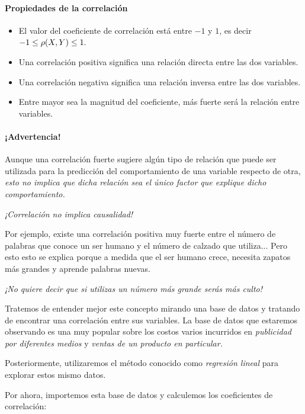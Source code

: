 \paragraph{Propiedades de la correlación}
\begin{itemize}
	\item El valor del coeficiente de correlación está entre $-1$ y $1$, es decir $-1\leq  \rho(X,Y)  \leq 1.$ 
	\item Una correlación positiva significa una relación directa entre las dos variables. 
	\item Una correlación negativa significa una relación inversa entre las dos variables. 
	\item Entre mayor sea la magnitud del coeficiente, más fuerte será la relación entre variables.
\end{itemize}


\paragraph{¡Advertencia!}
Aunque una correlación fuerte sugiere algún tipo de relación que puede ser utilizada para la predicción del comportamiento de una variable respecto de otra, \emph{esto no implica que dicha relación sea el único factor que explique dicho comportamiento.}


\begin{observacion}
	\emph{¡Correlación no implica causalidad!}
\end{observacion}



Por ejemplo, existe una correlación positiva muy fuerte entre el número de palabras que conoce un ser humano y el número de calzado que utiliza...  Pero esto esto se explica porque a medida que el ser humano crece, necesita zapatos más grandes y aprende palabras nuevas. 

\emph{¡No quiere decir que si utilizas un número más grande serás más culto!}


Tratemos de entender mejor este concepto mirando una base de datos y tratando de encontrar una correlación entre sus variables.  La base de datos que estaremos observando es una muy popular sobre los costos varios incurridos en \emph{publicidad por diferentes medios} y \emph{ventas de un producto en particular.}


Posteriormente, utilizaremos el método conocido como \emph{regresión lineal} para explorar estos mismo datos.

Por ahora, importemos esta base de datos y calculemos los coeficientes de correlación:

